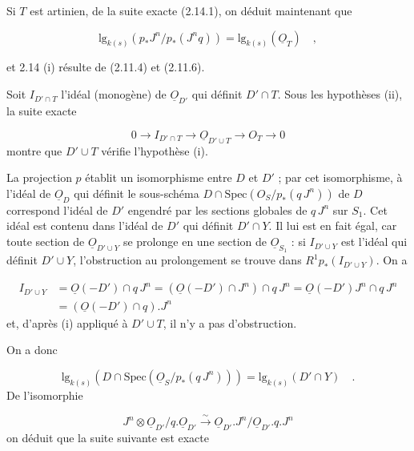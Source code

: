 Si $T$ est artinien, de la suite exacte (2.14.1), on déduit maintenant que

\begin{equation*}
\mathrm{lg}_{k(s)} (p_*J^n/p_*(J^nq)) = \mathrm{lg}_{k(s)} (\underline{O}_T) \quad , 
\end{equation*}


 et 2.14 (i) résulte de (2.11.4) et (2.11.6).

Soit $I_{D'\cap T}$ l'idéal (monogène) de $\underline{O}_{D'}$ qui définit $D'\cap T$. Sous les hypothèses (ii), la suite exacte

\begin{equation*}
0 \longrightarrow I_{D'\cap T} \longrightarrow \underline{O}_{D'\cup T} \longrightarrow O_T \longrightarrow 0
\end{equation*}
montre que $D'\cup T$ vérifie l'hypothèse (i).

La projection $p$ établit un isomorphisme entre $D$ et $D'$ ; par cet isomorphisme, à l'idéal de $\underline{O}_D$ qui définit le sous-schéma $D \cap \mathrm{Spec}(O_S/p_*(q\,J^n))$ de $D$ correspond l'idéal de $D'$ engendré par les sections globales de $q\,J^n$ sur $S_1$. Cet idéal est contenu dans l'idéal de $D'$ qui définit $D'\cap Y$. Il lui est en fait égal, car toute section de $\underline{O}_{D'\cup Y}$ se prolonge en une section de $\underline{O}_{S_1}$ : si $I_{D'\cup Y}$ est l'idéal qui définit $D'\cup Y$, l'obstruction au prolongement se trouve dans $R^1p_*(I_{D'\cup Y})$. On a

\begin{equation*}
\begin{array}{rl} I_{D'\cup Y} & = \underline{O}(-D')\cap q\,J^n = (\underline{O}(-D')\cap J^n) \cap q\,J^n = \underline{O}(-D')J^n \cap q\,J^n \\[2mm] & = (\underline{O}(-D')\cap q). J^n \end{array}
\end{equation*}
et, d'après (i) appliqué à $D'\cup T$, il n'y a pas d'obstruction.

On a donc

\begin{equation}\tag{2.14.2}
\mathrm{lg}_{k(s)} (D\cap \mathrm{Spec}(\underline{O}_S/p_*(q\,J^n))) = \mathrm{lg}_{k(s)} (D'\cap Y) \quad .
\end{equation}
De l'isomorphie

\begin{equation*}
J^n \otimes \underline{O}_{D'}/q.\underline{O}_{D'} \stackrel{\sim}{\longrightarrow} \underline{O}_{D'}.J^n/\underline{O}_{D'}.q.J^n
\end{equation*}
on déduit que la suite suivante est exacte

